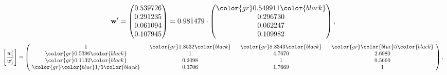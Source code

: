 \begin{example}
\begin{equation*}
\mathbf{w}^{\prime} =
\begin{pmatrix}
0.539726\\
0.291235\\
0.061094\\
0.107945
\end{pmatrix} =
0.981479\cdot
\begin{pmatrix}
\color{gr} 0.549911\color{black} \\
0.296730\\
0.062247\\
0.109982
\end{pmatrix},
\end{equation*}
\begin{equation*}
\left[ \frac{{w}^{\prime}_i}{{w}^{\prime}_j} \right] =
\begin{pmatrix}
$\,\,$ 1 $\,\,$ & $\,\,$\color{gr} 1.8532\color{black} $\,\,$ & $\,\,$\color{gr} 8.8343\color{black} $\,\,$ & $\,\,$\color{gr} \color{blue} 5\color{black} $\,\,$ \\
$\,\,$\color{gr} 0.5396\color{black} $\,\,$ & $\,\,$ 1 $\,\,$ & $\,\,$4.7670$\,\,$ & $\,\,$2.6980  $\,\,$ \\
$\,\,$\color{gr} 0.1132\color{black} $\,\,$ & $\,\,$0.2098$\,\,$ & $\,\,$ 1 $\,\,$ & $\,\,$0.5660 $\,\,$ \\
$\,\,$\color{gr} \color{blue}  1/5\color{black} $\,\,$ & $\,\,$0.3706$\,\,$ & $\,\,$1.7669$\,\,$ & $\,\,$ 1  $\,\,$ \\
\end{pmatrix},
\end{equation*}
\end{example}
\newpage
